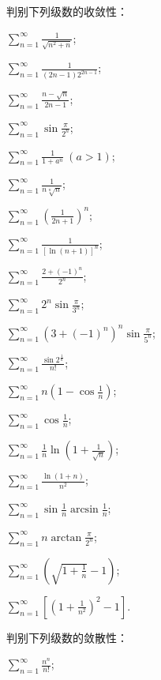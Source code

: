 \begin{xiti}
\item 判别下列级数的收敛性：
\begin{ziti}
\item $\displaystyle\sum_{n=1}^{\infty}\frac{1}{\sqrt{n^{2}+n}}$;
\item $\displaystyle\sum_{n=1}^{\infty}\frac{1}{(2n-1)2^{2n-1}}$;
\item $\displaystyle\sum_{n=1}^{\infty}\frac{n-\sqrt{n}}{2n-1}$;
\item $\displaystyle\sum_{n=1}^{\infty}\sin\frac{\pi}{2^n}$;
\item $\displaystyle\sum_{n=1}^{\infty}\frac{1}{1+a^{n}}\ (a>1)$;
\item $\displaystyle\sum_{n=1}^{\infty}\frac{1}{n\sqrt[n]{n}}$;
\item $\displaystyle\sum_{n=1}^{\infty}\left(\frac{1}{2n+1}\right)^{n}$;
\item $\displaystyle\sum_{n=1}^{\infty}\frac{1}{\left[\ln(n+1)\right]^{n}}$;
\item $\displaystyle\sum_{n=1}^{\infty}\frac{2+(-1)^{n}}{2^{n}}$;
\item $\displaystyle\sum_{n=1}^{\infty}2^{n}\sin\frac{\pi}{3^{n}}$;
\item $\displaystyle\sum_{n=1}^{\infty}(3+(-1)^n)^{n}\sin\frac{\pi}{5^{n}}$;
\item $\displaystyle\sum_{n=1}^{\infty}\frac{\sin 2^{\frac{1}{n}}}{n!}$;
\item $\displaystyle\sum_{n=1}^{\infty}n\left(1-\cos\frac{1}{n}\right)$;
\item $\displaystyle\sum_{n=1}^{\infty}\cos\frac{1}{n}$;
\item $\displaystyle\sum_{n=1}^{\infty}\frac{1}{n}\ln\left(1+\frac{1}{\sqrt{n}}\right)$;
\item $\displaystyle\sum_{n=1}^{\infty}\frac{\ln(1+n)}{n^{2}}$;
\item $\displaystyle\sum_{n=1}^{\infty}\sin\frac{1}{n}\arcsin\frac{1}{n}$;
\item $\displaystyle\sum_{n=1}^{\infty}n\arctan\frac{\pi}{2^n}$;
\item $\displaystyle\sum_{n=1}^{\infty}\left(\sqrt{1+\frac{1}{n}}-1\right)$;
\item $\displaystyle\sum_{n=1}^{\infty}\left[\left(1+\frac{1}{n^{2}}\right)^{2}-1\right]$.
\end{ziti}
\item 判别下列级数的敛散性：
\begin{ziti}
\item $\displaystyle\sum_{n=1}^{\infty}\frac{n^{n}}{n!}$;

\end{ziti}
\end{xiti}
